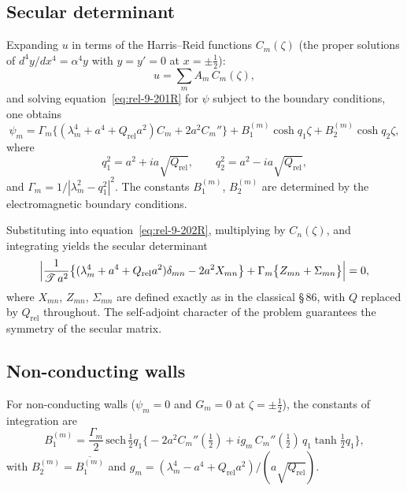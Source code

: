 \subsection{Secular determinant}
\label{sec:rel-88-secular}

Expanding $u$ in terms of the Harris--Reid functions $C_m(\zeta)$
(the proper solutions of $d^4y/dx^4 = \alpha^4 y$ with $y=y'=0$ at
$x=\pm\frac{1}{2}$):
\begin{equation}
  u = \sum_m A_m\,C_m(\zeta),
  \label{eq:rel-9-214R}
\end{equation}
and solving equation~\eqref{eq:rel-9-201R} for $\psi$ subject to the
boundary conditions, one obtains
\begin{equation}
  \psi_m = \Gamma_m\bigl\{(\lambda_m^4+a^4+Q_{\mathrm{rel}}a^2)C_m
    + 2a^2 C_m''\bigr\}
    + B_1^{(m)}\cosh q_1\zeta + B_2^{(m)}\cosh q_2\zeta,
  \label{eq:rel-9-217R}
\end{equation}
where
\begin{equation}
  q_1^2 = a^2 + ia\sqrt{Q_{\mathrm{rel}}},\qquad
  q_2^2 = a^2 - ia\sqrt{Q_{\mathrm{rel}}},
  \label{eq:rel-9-218R}
\end{equation}
and $\Gamma_m = 1/|\lambda_m^2 - q_1^2|^2$.  The constants
$B_1^{(m)}$, $B_2^{(m)}$ are determined by the electromagnetic
boundary conditions.

Substituting into equation~\eqref{eq:rel-9-202R}, multiplying by
$C_n(\zeta)$, and integrating yields the secular determinant
\begin{equation}
  \Bigl|\frac{1}{\mathscr{T}\,a^2}
    \bigl\{(\lambda_m^4+a^4+Q_{\mathrm{rel}}a^2)\delta_{mn}
      - 2a^2 X_{mn}\bigr\}
    + \Gamma_m\bigl\{Z_{mn} + \Sigma_{mn}\bigr\}\Bigr| = 0,
  \label{eq:rel-9-239R}
\end{equation}
where $X_{mn}$, $Z_{mn}$, $\Sigma_{mn}$ are defined exactly as in the
classical \S\,86, with $Q$ replaced by $Q_{\mathrm{rel}}$ throughout.
The self-adjoint character of the problem guarantees the symmetry of
the secular matrix.

\subsection{Non-conducting walls}
\label{sec:rel-88-nonconduct}

For non-conducting walls ($\psi_m = 0$ and $G_m = 0$ at
$\zeta = \pm\frac{1}{2}$), the constants of integration are
\begin{equation}
  B_1^{(m)} = \frac{\Gamma_m}{2}\,\mathrm{sech}\,\tfrac{1}{2}q_1
    \bigl\{-2a^2 C_m''(\tfrac{1}{2})
      + ig_m\,C_m''(\tfrac{1}{2})\,q_1\tanh\tfrac{1}{2}q_1\bigr\},
  \label{eq:rel-9-241aR}
\end{equation}
with $B_2^{(m)} = \overline{B_1^{(m)}}$ and
$g_m = (\lambda_m^4-a^4+Q_{\mathrm{rel}}a^2)/(a\sqrt{Q_{\mathrm{rel}}})$.


